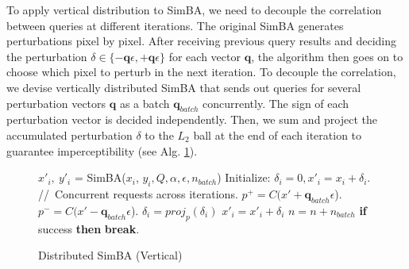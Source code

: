 
To apply vertical distribution to SimBA, we need to decouple the correlation between queries at different iterations. The original SimBA generates perturbations pixel by pixel. After receiving previous query results and deciding the perturbation $\delta \in \{-\boldsymbol{q}\epsilon, +\boldsymbol{q}\epsilon\}$ for each vector $\boldsymbol{q}$, the algorithm then goes on to choose which pixel to perturb in the next iteration. To decouple the correlation, we devise vertically distributed SimBA that sends out queries for several perturbation vectors $\boldsymbol{q}$ as a batch $\boldsymbol{q}_{batch}$ concurrently. The sign of each perturbation vector is decided independently. Then, we sum and project the accumulated perturbation $\delta$ to the $L_2$ ball at the end of each iteration to guarantee imperceptibility (see Alg. \ref{alg:simba_vertical}). 


\begin{figure}[H]
\begin{minipage}{\textwidth}
\begin{algorithm}[H]
    \centering
    \caption{Distributed SimBA (Vertical)}
    \label{alg:simba_vertical}
    \begin{algorithmic}[1]
            \State $x'_{i},\ y'_{i}$ = SimBA($x_{i}$, $y_{i}, Q, \alpha, \epsilon, n_{batch}$)
            \Indent
                \State Initialize: $\delta_i = 0, x'_{i} = x_i + \delta_i$.
                \For {each iteration $n \in [0,\ n_{iter})$}
                    \State {}
                    \State //\ Concurrent requests across iterations.
                    \State $p^+ = C(x{'} + \boldsymbol{q}_{batch}\epsilon$).
                    \State $p^- = C(x{'} - \boldsymbol{q}_{batch}\epsilon$).
                            \State {} 
                            \State {} 
                        \EndIf
                    \EndFor
                    \State $\delta_i = proj_{p}(\delta_i)$
                    \State $x'_i = x'_i + \delta_i$
                    \State $n = n + n_{batch}$
                    \State \textbf{if} {success} \textbf{then} {\textbf{break}}.
                \EndFor
            \EndIndent
        \EndFor
    \end{algorithmic}
\end{algorithm}
\end{minipage}
\end{figure}

